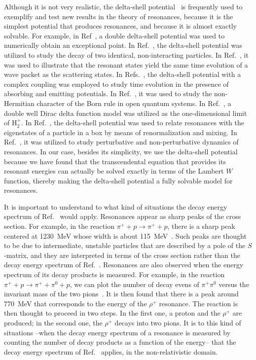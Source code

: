 \documentclass[12pt]{article}
\begin{document}
Although it is not very realistic, the delta-shell 
potential~\cite{GOTTFRIED,WINTER,DICUS} is frequently used to 
exemplify and test new results in the 
theory of resonances, because it is the simplest potential that produces 
resonances, and because it is almost exactly solvable. For example, in 
Ref~\cite{MONDRAGON00}, a double
delta-shell potential was used to numerically obtain an exceptional point. In 
Ref.~\cite{GASTON11}, the delta-shell potential was utilized to study the
decay of two identical, non-interacting particles. In Ref.~\cite{GASTON12},
it was used to illustrate that the resonant states yield the same time
evolution of a wave packet as the scattering states. In
Refs.~\cite{GASTON13,GASTONPRA14}, the delta-shell
potential with a complex coupling was employed to study time evolution in
the presence of absorbing and emitting potentials. In Ref.~\cite{GASTON17},
it was used to study the non-Hermitian character of the Born rule in
open quantum systems. In 
Ref.~\cite{SCOTT}, a double well Dirac delta function model was utilized as 
the one-dimensional limit of H$_2^+$. In Ref.~\cite{SANTINI1}, the 
delta-shell potential was used to relate resonances 
with the eigenstates of a particle in a box by means of renormalization
and mixing. In Ref.~\cite{SANTINI2}, it was utilized to
study perturbative and non-perturbative dynamics of resonances. In our case,
besides its simplicity, we use the delta-shell potential because 
we have found that the transcendental equation that provides its
resonant energies can actually be solved exactly in terms of the 
Lambert $W$ function, thereby making the delta-shell potential a 
fully solvable model for resonances.

It is important to understand to what kind of situations the decay
energy spectrum of Ref.~\cite{NPA15} would
apply. Resonances appear as sharp peaks of the cross section. For example, 
in the reaction $\pi ^+ +p \to \pi ^+ +p$,
there is a sharp peak centered at 1230~MeV whose width is about 
115~MeV~\cite{SEGRE}. Such peaks are thought to be due to intermediate,
unstable particles that are described by a pole of the $S$-matrix, and they
are interpreted in terms of the cross section rather than the decay energy
spectrum of Ref.~\cite{NPA15}. Resonances are also observed 
when the energy spectrum of its decay products is
measured. For example, in the reaction $\pi ^+ +p \to \pi ^++\pi^0 +p$, we can
plot the number of decay evens of $\pi ^+\pi^0$ versus the invariant mass
of the two pions~\cite{SEGRE}. It is then found that there is a peak
around 770~MeV that corresponds to the energy of the $\rho ^+$ resonance. The
reaction is then thought to proceed in two steps. In the first one, a 
proton and the $\rho ^+$ are produced; in the second one, the $\rho ^+$ decays
into two pions. It is to this kind of situations --when the decay energy 
spectrum of a resonance is measured by counting the number of
decay products as a function of the energy-- that the decay energy 
spectrum of Ref.~\cite{NPA15} applies, in the non-relativistic domain. 
\end{document}
